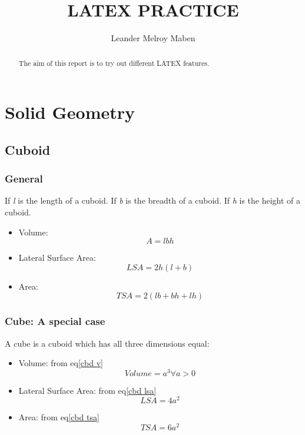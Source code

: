 \documentclass[a4paper,11pt]{report}
\title{LATEX PRACTICE}
\author{Leander Melroy Maben}
\begin{document}
\maketitle
\tableofcontents

\begin{abstract}
The aim of this report is to try out different LATEX features.
\end{abstract}

\chapter{Solid Geometry}
\section{Cuboid}
\subsection{General}

If \emph{l} is the length of a cuboid.
If \emph{b} is the breadth of a cuboid.
If \emph{h} is the height of a cuboid.

\begin{itemize}

\item Volume:
\begin{equation}
\label{cbd v}
A=lbh
\end{equation}
\item Lateral Surface Area:
\begin{equation}
\label{cbd lsa}
LSA=2h(l+b)
\end{equation}
\item Area:
\begin{equation}
\label{cbd tsa}
TSA=2(lb+bh+lh)
\end{equation}
\end{itemize}
\subsection{Cube: A special case}
A cube is a cuboid which has all three dimensions equal:
\begin{itemize}
\item Volume:
from eq\ref{cbd v}
\begin{equation}
\label{cb v}
Volume=a^3 \forall a>0
\end{equation}
\item Lateral Surface Area:
from eq\ref{cbd lsa}
\begin{equation}
\label{cb lsa}
LSA=4a^2
\end{equation}
\item Area:
from eq\ref{cbd tsa}
\begin{equation}
\label{cb tsa}
TSA=6a^2
\end{equation}
\end{itemize}
\nocite{7338643}


\end{document}
